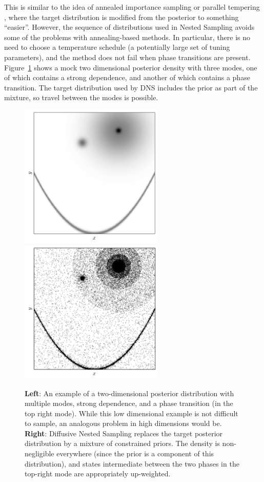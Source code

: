 \documentclass[letterpaper, 11pt]{article}
\begin{document}
This is similar to the idea of annealed importance sampling
\citep{neal} or parallel tempering \citep{pt},
where the target distribution is modified from the posterior to something
``easier''. However,
the sequence of distributions used in Nested Sampling avoids some of the
problems with annealing-based methods. In particular, there is no need to choose
a temperature schedule (a potentially large set of tuning parameters),
and the method does not fail when phase transitions
are present.
Figure~\ref{fig:challenges} shows a mock two dimensional posterior
density with three modes, one of which contains a strong dependence, and
another of which contains a phase transition. The target distribution used by
DNS includes the prior as part of the mixture, so travel between the modes is
possible.

\begin{figure}
\begin{minipage}[lr]{\textwidth}
\begin{center}
\includegraphics[width=2.7in]{challenges.pdf}
\includegraphics[width=2.7in]{dnest.png}
\end{center}
\end{minipage}
\caption{{\bf Left}: An example of a two-dimensional posterior distribution
with multiple modes, strong dependence, and a phase transition (in the top
right mode). While this low dimensional example is not difficult to sample,
an analogous problem in high dimensions would be. {\bf Right}: Diffusive
Nested Sampling replaces the target posterior distribution by a mixture of
constrained priors. The density is non-negligible everywhere (since the prior
is a component of this distribution), and states intermediate between the two
phases in the top-right mode are appropriately up-weighted.
\label{fig:challenges}}
\end{figure}
\end{document}
